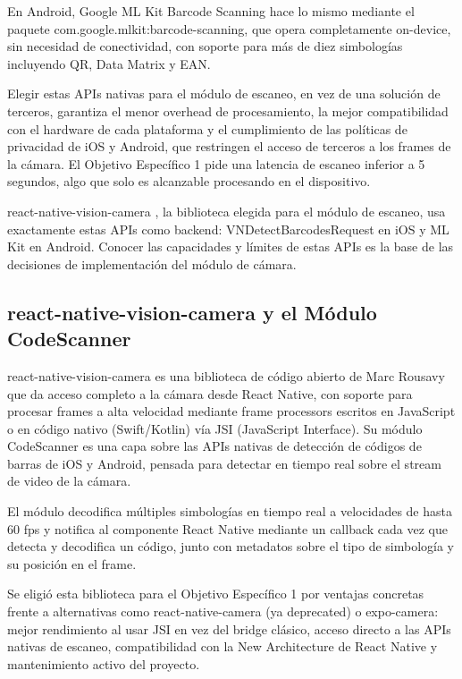 En Android, Google ML Kit Barcode Scanning \cite{google_mlkit_barcode} hace lo mismo mediante el paquete com.goo\-gle.mlkit:barcode-scanning, que opera completamente on-device, sin necesidad de conectividad, con soporte para m\'as de diez simbolog\'ias incluyendo QR, Data Matrix y EAN.

Elegir estas APIs nativas para el m\'odulo de escaneo, en vez de una soluci\'on de terceros, garantiza el menor overhead de procesamiento, la mejor compatibilidad con el hardware de cada plataforma y el cumplimiento de las pol\'iticas de privacidad de iOS y Android, que restringen el acceso de terceros a los frames de la c\'amara. El Objetivo Espec\'ifico 1 pide una latencia de escaneo inferior a 5 segundos, algo que solo es alcanzable procesando en el dispositivo.

react-native-vision-camera \cite{rousavy_visioncamera}, la biblioteca elegida para el m\'odulo de escaneo, usa exactamente estas APIs como backend: VNDetectBarcodesRequest en iOS y ML Kit en Android. Conocer las capacidades y l\'imites de estas APIs es la base de las decisiones de implementaci\'on del m\'odulo de c\'amara.

\subsection{react-native-vision-camera y el M\'odulo CodeScanner}

react-native-vision-camera \cite{rousavy_visioncamera} es una biblioteca de c\'odigo abierto de Marc Rousavy que da acceso completo a la c\'amara desde React Native, con soporte para procesar frames a alta velocidad mediante frame processors escritos en JavaScript o en c\'odigo nativo (Swift/Kotlin) v\'ia JSI (JavaScript Interface). Su m\'odulo CodeScanner es una capa sobre las APIs nativas de detecci\'on de c\'odigos de barras de iOS y Android, pensada para detectar en tiempo real sobre el stream de video de la c\'amara.

El m\'odulo decodifica m\'ultiples simbolog\'ias en tiempo real a velocidades de hasta 60 fps y notifica al componente React Native mediante un callback cada vez que detecta y decodifica un c\'odigo, junto con metadatos sobre el tipo de simbolog\'ia y su posici\'on en el frame.

Se eligi\'o esta biblioteca para el Objetivo Espec\'ifico 1 por ventajas concretas frente a alternativas como react-native-camera (ya deprecated) o expo-camera: mejor rendimiento al usar JSI en vez del bridge cl\'asico, acceso directo a las APIs nativas de escaneo, compatibilidad con la New Architecture de React Native \cite{meta_rn_newarch} y mantenimiento activo del proyecto.

